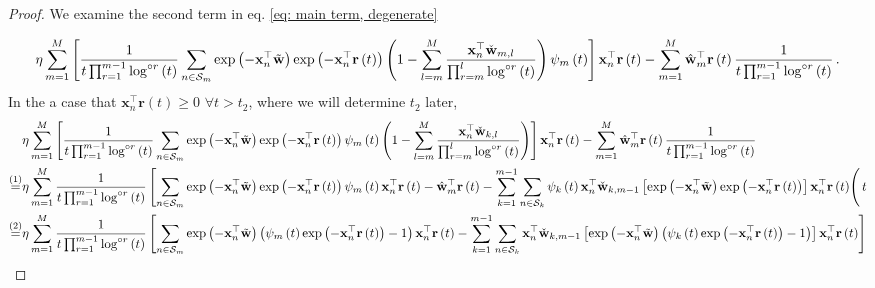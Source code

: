 \documentclass[twoside,11pt,english]{article}
\begin{document}
{\begin{proof}
We examine the second term in eq. \ref{eq: main term, degenerate} 

\[
\eta\sum_{m=1}^{M}\left[\frac{1}{t\prod_{r=1}^{m-1}\log^{\circ r}\left(t\right)}\sum_{n\in\mathcal{S}_{m}}\exp\left(-\mathbf{x}_{n}^{\top}\tilde{\mathbf{w}}\right)\exp\left(-\mathbf{x}_{n}^{\top}\mathbf{r}\left(t\right)\right)\left(1-\sum_{l=m}^{M}\frac{\mathbf{x}_{n}^{\top}\check{\mathbf{w}}_{m,l}}{\prod_{r=m}^{l}\log^{\circ r}\left(t\right)}\right)\psi_{m}\left(t\right)\right]\mathbf{x}_{n}^{\top}\mathbf{r}\left(t\right)-\sum_{m=1}^{M}\hat{\mathbf{w}}_{m}^{\top}\mathbf{r}\left(t\right)\frac{1}{t\prod_{r=1}^{m-1}\log^{\circ r}\left(t\right)}\,.
\]
In the a case that $\mathbf{x}_{n}^{\top}\mathbf{r}\left(t\right)\geq0$
$\forall t>t_{2}$, where we will determine $t_{2}$ later, {\tiny
\begin{align}
 & \eta\sum_{m=1}^{M}\left[\frac{1}{t\prod_{r=1}^{m-1}\log^{\circ r}\left(t\right)}\sum_{n\in\set_{m}}\exp\left(-\mathbf{x}_{n}^{\top}\wtilde\right)\exp\left(-\mathbf{x}_{n}^{\top}\mathbf{r}\left(t\right)\right)\psi_{m}\left(t\right)\left(1-\sum_{l=m}^{M}\frac{\mathbf{x}_{n}^{\top}\check{\mathbf{w}}_{k,l}}{\prod_{r=m}^{l}\log^{\circ r}\left(t\right)}\right)\right]\mathbf{x}_{n}^{\top}\mathbf{r}\left(t\right)-\sum_{m=1}^{M}\hat{\mathbf{w}}_{m}^{\top}\mathbf{r}\left(t\right)\frac{1}{t\prod_{r=1}^{m-1}\log^{\circ r}\left(t\right)}\nonumber \\
\overset{\left(1\right)}{=} & \eta\sum_{m=1}^{M}\frac{1}{t\prod_{r=1}^{m-1}\log^{\circ r}\left(t\right)}\left[\sum_{n\in\set_{m}}\exp\left(-\mathbf{x}_{n}^{\top}\wtilde\right)\exp\left(-\mathbf{x}_{n}^{\top}\mathbf{r}\left(t\right)\right)\psi_{m}\left(t\right)\mathbf{x}_{n}^{\top}\mathbf{r}\left(t\right)-\hat{\mathbf{w}}_{m}^{\top}\mathbf{r}\left(t\right)-\sum_{k=1}^{m-1}\sum_{n\in\set_{k}}\psi_{k}\left(t\right)\mathbf{x}_{n}^{\top}\check{\mathbf{w}}_{k,m-1}\left[\exp\left(-\mathbf{x}_{n}^{\top}\wtilde\right)\exp\left(-\mathbf{x}_{n}^{\top}\mathbf{r}\left(t\right)\right)\right]\mathbf{x}_{n}^{\top}\mathbf{r}\left(t\right)\right(t\nonumber \\
\overset{\left(2\right)}{=} & \eta\sum_{m=1}^{M}\frac{1}{t\prod_{r=1}^{m-1}\log^{\circ r}\left(t\right)}\left[\sum_{n\in\set_{m}}\exp\left(-\mathbf{x}_{n}^{\top}\wtilde\right)\left(\psi_{m}\left(t\right)\exp\left(-\mathbf{x}_{n}^{\top}\mathbf{r}\left(t\right)\right)-1\right)\mathbf{x}_{n}^{\top}\mathbf{r}\left(t\right)-\sum_{k=1}^{m-1}\sum_{n\in\set_{k}}\mathbf{x}_{n}^{\top}\check{\mathbf{w}}_{k,m-1}\left[\exp\left(-\mathbf{x}_{n}^{\top}\wtilde\right)\left(\psi_{k}\left(t\right)\exp\left(-\mathbf{x}_{n}^{\top}\mathbf{r}\left(t\right)\right)-1\right)\right]\mathbf{x}_{n}^{\top}\mathbf{r}\left(t\right)\right]\nonumber \\

\end{align}}
\end{proof}}
\end{document}
